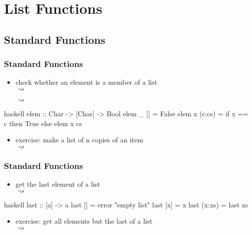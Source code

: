\documentclass[dvipsnames]{beamer}
\theoremstyle{plain}
\begin{document}
\section{List Functions}

\subsection{Standard Functions}

\begin{frame}[fragile]
  \frametitle{Standard Functions}

  \begin{itemize}
    \item check whether an element is a member of a list\\
       $\rightsquigarrow$

       $\rightsquigarrow$
  \end{itemize}

  \begin{exampleblock}{}
    \begin{pygments}{haskell}
elem :: Char -> [Char] -> Bool
elem _ []     = False
elem x (c:cs) = if x == c then True else elem x cs
    \end{pygments}
  \end{exampleblock}

  \pause
  \begin{itemize}
    \item exercise: make a list of n copies of an item\\
       $\rightsquigarrow$
  \end{itemize}
\end{frame}

\begin{frame}[fragile]
  \frametitle{Standard Functions}

  \begin{itemize}
    \item get the last element of a list\\
       $\rightsquigarrow$
  \end{itemize}

  \begin{exampleblock}{}
    \begin{pygments}{haskell}
last :: [a] -> a
last []     = error "empty list"
last [x]    = x
last (x:xs) = last xs
    \end{pygments}
  \end{exampleblock}

  \pause
  \begin{itemize}
    \item exercise: get all elements but the last of a list\\
       $\rightsquigarrow$
  \end{itemize}
\end{frame}
\end{document}
